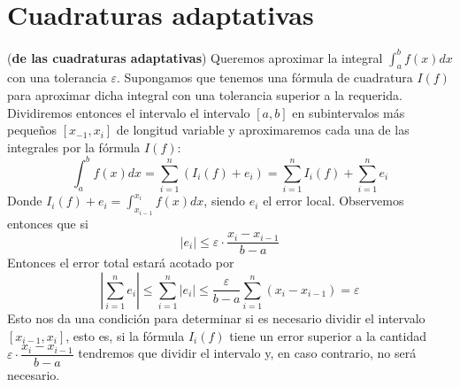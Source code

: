  \section{Cuadraturas adaptativas}
\begin{met}(\textbf{de las cuadraturas adaptativas})
Queremos aproximar la integral $\int_a^bf(x)dx$ con una tolerancia $\varepsilon$. Supongamos que tenemos una fórmula de cuadratura $I(f)$ para aproximar dicha integral con una tolerancia superior a la requerida. Dividiremos entonces el intervalo el intervalo $[a,b]$ en subintervalos más pequeños $[x_{-1},x_{i}]$ de longitud variable y aproximaremos cada una de las integrales por la fórmula $I(f)$:
$$\int_a^bf(x)dx=\sum_{i=1}^n(I_i(f)+e_i)=\sum_{i=1}^nI_i(f)+\sum_{i=1}^ne_i$$
Donde $I_{i}(f)+e_i=\int_{x_{i-1}}^{x_i}f(x)dx$, siendo $e_i$ el error local. Observemos entonces que si
$$|e_i|\leq\varepsilon\cdot\dfrac{x_i-x_{i-1}}{b-a}$$
Entonces el error total estará acotado por
$$\left|\sum_{i=1}^ne_i\right|\leq\sum_{i=1}^n|e_i|\leq\dfrac{\varepsilon}{b-a}\sum_{i=1}^n(x_{i}-x_{i-1})=\varepsilon$$
Esto nos da una condición para determinar si es necesario dividir el intervalo $[x_{i-1},x_i]$, esto es, si la fórmula $I_i(f)$ tiene un error superior a la cantidad $\varepsilon\cdot\dfrac{x_i-x_{i-1}}{b-a}$ tendremos que dividir el intervalo y, en caso contrario, no será necesario.


\end{met}
